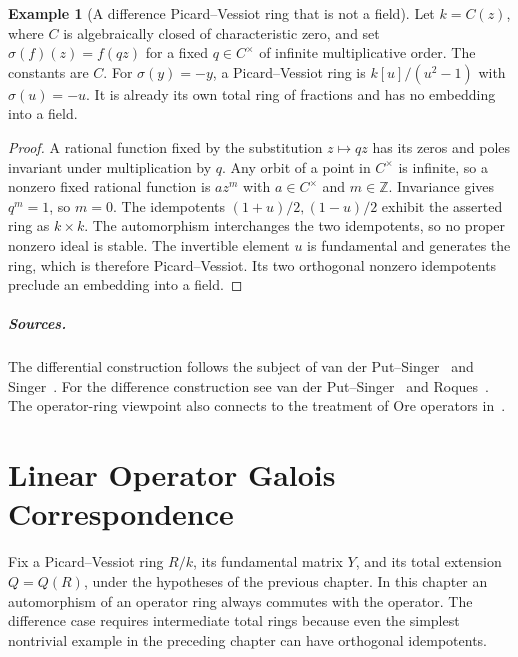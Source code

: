 \documentclass[11pt,oneside,openany]{book}
\theoremstyle{definition}
\newtheorem{example}[theorem]{Example}
\theoremstyle{remark}
\begin{document}
\begin{example}[A difference Picard--Vessiot ring that is not a field]
\label{res:PV10}
Let \(k=C(z)\), where \(C\) is algebraically closed of
characteristic zero, and set
\(\sigma(f)(z)=f(qz)\) for a fixed \(q\in C^\times\) of infinite
multiplicative order. The constants are \(C\). For
\(\sigma(y)=-y\), a Picard--Vessiot ring is
\(k[u]/(u^2-1)\) with \(\sigma(u)=-u\). It is already its
own total ring of fractions and has no embedding into a field.
\end{example}

\begin{proof}
A rational function fixed by the substitution \(z\mapsto qz\)
has its zeros and poles invariant under multiplication by \(q\).
Any orbit of a point in \(C^\times\) is infinite, so a nonzero
fixed rational function is \(az^m\) with \(a\in C^\times\) and
\(m\in\mathbb Z\). Invariance gives \(q^m=1\), so \(m=0\).
The idempotents \((1+u)/2,(1-u)/2\) exhibit the asserted ring
as \(k\times k\). The automorphism interchanges the two
idempotents, so no proper nonzero ideal is stable. The
invertible element \(u\) is fundamental and generates the ring,
which is therefore Picard--Vessiot. Its two orthogonal nonzero
idempotents preclude an embedding into a field.
\end{proof}

\paragraph{Sources.}
The differential construction follows the subject of
van der Put--Singer~\cite[Chapter 1, Sections 1.1--1.3]{vps-differential}
and Singer~\cite[Sections 1.2--1.3]{singer}. For the difference
construction see van der Put--Singer~\cite[Chapter 1, Section 1.1]{vps-difference}
and Roques~\cite[Definitions 7--8, Propositions 9 and 12, Theorems 13 and 17]{roques}.
The operator-ring viewpoint also connects to the treatment of Ore
operators in~\cite[Chapter 4]{mg-rm03d}.
\chapter{Linear Operator Galois Correspondence}

Fix a Picard--Vessiot ring \(R/k\), its fundamental matrix \(Y\),
and its total extension \(Q=Q(R)\), under the hypotheses of the
previous chapter. In this chapter an automorphism of an operator
ring always commutes with the operator. The difference case requires
intermediate total rings because even the simplest nontrivial
example in the preceding chapter can have orthogonal idempotents.
\end{document}
